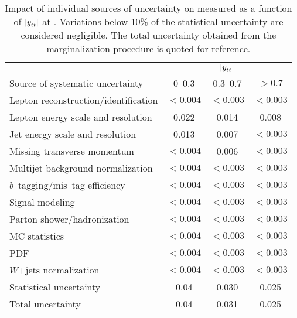\begin{table}[!htbp]\centering
\begin{tabular}{l c c c}
\toprule
 & \multicolumn{3}{c}{$|y_{t\bar{t}}{}|$}    \\
Source of systematic uncertainty           &    $0$--$0.3$          &        $0.3$--$0.7$     &  $>0.7$   \\
\midrule
Lepton reconstruction/identification              & $<0.004$ & $<0.003$ & $<0.003$ \\
Lepton energy scale and resolution                & 0.022 & 0.014 & 0.008   \\
Jet energy scale and resolution                   & 0.013 & 0.007 & $<0.003$   \\
Missing transverse momentum & $<0.004$ & 0.006 & $<0.003$ \\
Multijet background normalization    & $<0.004$ & $<0.003$ & $<0.003$  \\
$b$--tagging/mis--tag efficiency                & $<0.004$ & $<0.003$ & $<0.003$  \\
Signal modeling                        & $<0.004$ & $<0.003$ & $<0.003$  \\
Parton shower/hadronization             & $<0.004$ & $<0.003$ & $<0.003$  \\
MC statistics                 & $<0.004$ & $<0.003$ & $<0.003$  \\
PDF                                     & $<0.004$ & $<0.003$ & $<0.003$  \\
$W$+jets normalization        & $<0.004$ & $<0.003$ & $<0.003$  \\
\midrule
Statistical uncertainty                 & 0.04       &        0.030      &        0.025     \\
\midrule
Total uncertainty                 & 0.04       &        0.031      &        0.025     \\
\bottomrule
\end{tabular}
\caption{Impact of individual sources of uncertainty on
  \ac{} measured as a function of $|y_{t\bar{t}}{}|$ at \seventev{}. Variations below 10\%
  of the statistical uncertainty are considered negligible. The total uncertainty obtained from the
  marginalization procedure is quoted for reference.}
\label{table:Systematics_ytt}
\end{table}

